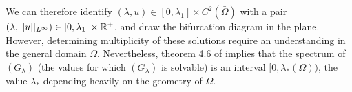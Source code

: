 We can therefore identify $(\lambda,u)\in [0,\lambda_1]\times C^2(\bar\Omega)$
with a pair $(\lambda, ||u||_{L^\infty})\in[0,\lambda_1]\times \mathbb{R}^+$, and draw
the bifurcation diagram in the plane. However, determining multiplicity of these
solutions require an understanding in the general domain $\Omega$. Nevertheless,
theorem 4.6 of \cite{isoperimetric-inequalities} implies that the spectrum of
$(G_\lambda)$ (\ie the values for which $(G_\lambda)$ is solvable) is an
interval $[0,\lambda_\ast(\Omega))$, the value $\lambda_\ast$ depending heavily
on the geometry of $\Omega$.
